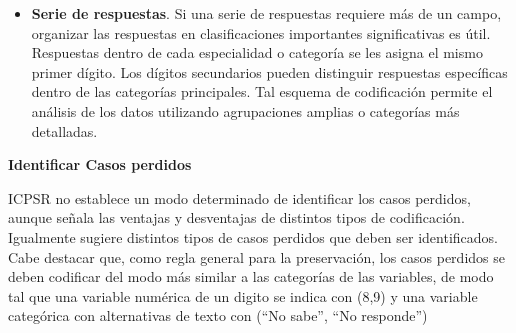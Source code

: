 \documentclass[
  spanish,
  letterpaper,
  DIV=11,
  numbers=noendperiod]{scrreprt}
\begin{document}
\begin{itemize}
  más de un código a la respuesta de una entrevista, esto resalta
  problemas o ambigüedades en el esquema de codificación. Esta
  codificación de verificación proporciona un medio importante de
  control de calidad en el proceso de codificación.
\item
  \textbf{Serie de respuestas}. Si una serie de respuestas requiere más
  de un campo, organizar las respuestas en clasificaciones importantes
  significativas es útil. Respuestas dentro de cada especialidad o
  categoría se les asigna el mismo primer dígito. Los dígitos
  secundarios pueden distinguir respuestas específicas dentro de las
  categorías principales. Tal esquema de codificación permite el
  análisis de los datos utilizando agrupaciones amplias o categorías más
  detalladas.
\end{itemize}

\textbf{Identificar Casos perdidos}

ICPSR no establece un modo determinado de identificar los casos
perdidos, aunque señala las ventajas y desventajas de distintos tipos de
codificación. Igualmente sugiere distintos tipos de casos perdidos que
deben ser identificados. Cabe destacar que, como regla general para la
preservación, los casos perdidos se deben codificar del modo más similar
a las categorías de las variables, de modo tal que una variable numérica
de un digito se indica con (8,9) y una variable categórica con
alternativas de texto con (``No sabe'', ``No responde'')
\end{document}
